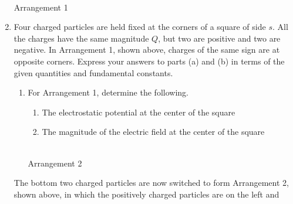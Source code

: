 \documentclass{../../../oss-apphys}
\begin{document}
\begin{enumerate}[leftmargin=15pt]
\begin{center}
  \\
  Arrangement 1
\end{center}
\item Four charged particles are held fixed at the corners of a square of
  side $s$. All the charges have the same magnitude $Q$, but two are positive
  and two are negative. In Arrangement 1, shown above, charges of the same
  sign are at opposite corners. Express your answers to parts (a) and (b) in
  terms of the given quantities and fundamental constants.
  \begin{enumerate}[leftmargin=15pt]
  \item For Arrangement 1, determine the following.
    \begin{enumerate}[leftmargin=15pt]
    \item The electrostatic potential at the center of the square
    \item The magnitude of the electric field at the center of the square
    \end{enumerate}
    \begin{center}
      \\
      Arrangement 2
    \end{center}
  \end{enumerate}
  The bottom two charged particles are now switched to form Arrangement 2,
  shown above, in which the positively charged particles are on the left and

\end{enumerate}
\end{document}
